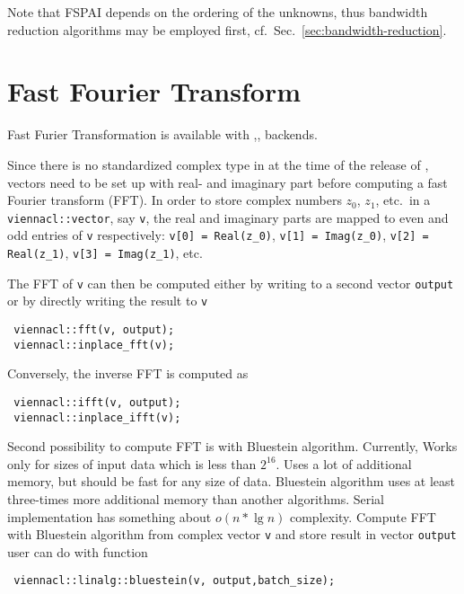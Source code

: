 Note that FSPAI depends on the ordering of the unknowns, thus bandwidth reduction algorithms may be employed first, cf.~Sec.~\ref{sec:bandwidth-reduction}.


\section{Fast Fourier Transform}

Fast Furier Transformation is available with {\OpenCL},{\CUDA},{\OpenMP} backends.

Since there is no standardized complex type in {\OpenCL} at the time of the release of {\ViennaCLversion}, vectors need to be set up with real- and imaginary
part before computing a fast Fourier transform (FFT). In order to store complex numbers $z_0$, $z_1$, etc.~in a \lstinline|viennacl::vector|, say \lstinline|v|,
the real and imaginary parts are mapped to even and odd entries of \lstinline|v| respectively: \lstinline|v[0] = Real(z_0)|, \lstinline|v[1] = Imag(z_0)|,
\lstinline|v[2] = Real(z_1)|, \lstinline|v[3] = Imag(z_1)|, etc.

The FFT of \lstinline|v| can then be computed either by writing to a second vector \lstinline|output| or by directly writing the result to \lstinline|v|
\begin{lstlisting}
 viennacl::fft(v, output);
 viennacl::inplace_fft(v);
\end{lstlisting}
Conversely, the inverse FFT is computed as
\begin{lstlisting}
 viennacl::ifft(v, output);
 viennacl::inplace_ifft(v);
\end{lstlisting}

Second possibility to compute FFT is with Bluestein algorithm. Currently,  Works only for sizes of input data which is less than $2^{16}$. Uses a lot of additional 
memory, but should be fast for any size of data. Bluestein algorithm uses at least three-times more additional memory than another algorithms. 
Serial implementation has something about $o(n * \lg n)$ complexity.
Compute FFT with Bluestein algorithm from complex vector \lstinline|v| and store result in vector \lstinline|output| user can do with function
\begin{lstlisting}
 viennacl::linalg::bluestein(v, output,batch_size);
\end{lstlisting}


